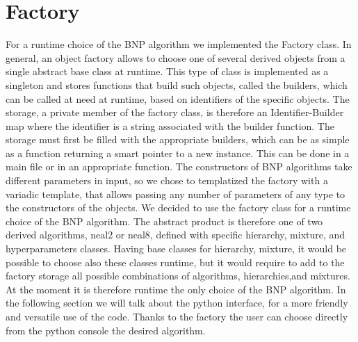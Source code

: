 \chapter{Factory}

For a runtime choice of the BNP algorithm we implemented the Factory class. In general,  an object factory allows to choose one of several derived objects from a single abstract base class at runtime. This type of class is implemented as a singleton and stores functions that build such objects, called the builders, which can be called at need at runtime, based on identifiers of the specific objects.
The storage, a private member of the factory class, is therefore an Identifier-Builder map where the identifier is a string associated with the builder function.
 The storage must first be filled with the appropriate builders, which can be as simple as a function returning a smart pointer to a new instance. This can be done in a main file or in an appropriate function.
The constructors of BNP algorithms take different parameters in input, so we chose to templatized the factory with a variadic template, that allows passing any number of parameters of any type to the constructors of the objects. 
We decided to use the factory class for a runtime choice of the BNP algorithm. The abstract product is therefore one of two derived algorithms, neal2 or neal8, defined with specific hierarchy, mixture, and hyperparameters classes. Having base classes for hierarchy, mixture, it would be possible to choose also these classes runtime, but it would require to add to the factory storage all possible combinations of algorithms, hierarchies,and mixtures.
At the moment it is therefore runtime the only choice of the BNP algorithm.
In the following section we will talk about the python interface, for a more friendly and versatile use of the code. Thanks to the factory the user can choose directly from the python console the desired algorithm.
